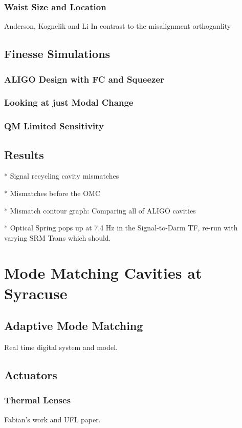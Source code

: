 \documentclass[10pt,a4paper]{book}
\begin{document}
		\subsection{Waist Size and Location}
		Anderson, Kognelik and Li
		\newline
		In contrast to the misalignment orthoganlity 
	
	\section{Finesse Simulations}
		\subsection{ALIGO Design with FC and Squeezer}
		\subsection{Looking at just Modal Change}
		\subsection{QM Limited Sensitivity}
			
	\section{Results}
		* Signal recycling cavity mismatches

		* Mismatches before the OMC
			
		* Mismatch contour graph: Comparing all of ALIGO cavities
			
		* Optical Spring pops up at 7.4 Hz in the Signal-to-Darm TF, re-run with varying SRM Trans which should.

\chapter{Mode Matching Cavities at Syracuse}

	\section{Adaptive Mode Matching}
	Real time digital system and model.
	
	\section{Actuators}
		\subsection{Thermal Lenses}
		Fabian's work and UFL paper.
\end{document}
